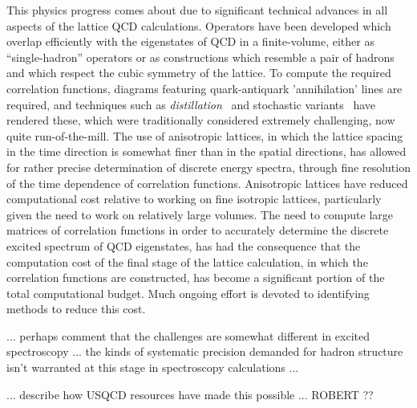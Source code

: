 This physics progress comes about due to significant technical advances in all aspects of the lattice QCD calculations. Operators have been developed which overlap efficiently with the eigenstates of QCD in a finite-volume, either as ``single-hadron'' operators or as constructions which resemble a pair of hadrons and which respect the cubic symmetry of the lattice. To compute the required correlation functions, diagrams featuring quark-antiquark 'annihilation' lines are required, and techniques such as \emph{distillation}~\cite{Peardon:2009gh} and stochastic variants~\cite{Morningstar:2011ka} have rendered these, which were traditionally considered extremely challenging, now quite run-of-the-mill. The use of anisotropic lattices, in which the lattice spacing in the time direction is somewhat finer than in the spatial directions, has allowed for rather precise determination of discrete energy spectra, through fine resolution of the time dependence of correlation functions. Anisotropic lattices have reduced computational cost relative to working on fine isotropic lattices, particularly given the need to work on relatively large volumes. The need to compute large matrices of correlation functions in order to accurately determine the discrete excited spectrum of QCD eigenstates, has had the consequence that the computation cost of the final stage of the lattice calculation, in which the correlation functions are constructed, has become a significant portion of the total computational budget. Much ongoing effort is devoted to identifying methods to reduce this cost. 



{\color{red}... perhaps comment that the challenges are somewhat different in excited spectroscopy ... the kinds of systematic precision demanded for hadron structure isn't warranted at this stage in spectroscopy calculations ...  }

{\color{red} ... describe how USQCD resources have made this possible ...  ROBERT ??}







